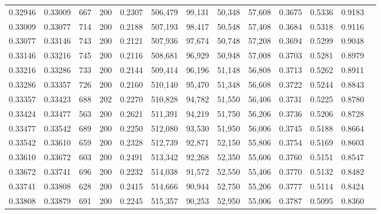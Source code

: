 \begin{tabular}{rrrrrrrrrrrrr}
0.32946 & 0.33009 &    667 & 200 &                                     0.2307 & 506,479 &  99,131 &  50,348 &  57,608 & 0.3675 & 0.5336 & 0.9183 \\
0.33009 & 0.33077 &    714 & 200 &                                     0.2188 & 507,193 &  98,417 &  50,548 &  57,408 & 0.3684 & 0.5318 & 0.9116 \\
0.33077 & 0.33146 &    743 & 200 &                                     0.2121 & 507,936 &  97,674 &  50,748 &  57,208 & 0.3694 & 0.5299 & 0.9048 \\
0.33146 & 0.33216 &    745 & 200 &                                     0.2116 & 508,681 &  96,929 &  50,948 &  57,008 & 0.3703 & 0.5281 & 0.8979 \\
0.33216 & 0.33286 &    733 & 200 &                                     0.2144 & 509,414 &  96,196 &  51,148 &  56,808 & 0.3713 & 0.5262 & 0.8911 \\
0.33286 & 0.33357 &    726 & 200 &                                     0.2160 & 510,140 &  95,470 &  51,348 &  56,608 & 0.3722 & 0.5244 & 0.8843 \\
0.33357 & 0.33423 &    688 & 202 &                                     0.2270 & 510,828 &  94,782 &  51,550 &  56,406 & 0.3731 & 0.5225 & 0.8780 \\
0.33424 & 0.33477 &    563 & 200 &                                     0.2621 & 511,391 &  94,219 &  51,750 &  56,206 & 0.3736 & 0.5206 & 0.8728 \\
0.33477 & 0.33542 &    689 & 200 &                                     0.2250 & 512,080 &  93,530 &  51,950 &  56,006 & 0.3745 & 0.5188 & 0.8664 \\
0.33542 & 0.33610 &    659 & 200 &                                     0.2328 & 512,739 &  92,871 &  52,150 &  55,806 & 0.3754 & 0.5169 & 0.8603 \\
0.33610 & 0.33672 &    603 & 200 &                                     0.2491 & 513,342 &  92,268 &  52,350 &  55,606 & 0.3760 & 0.5151 & 0.8547 \\
0.33672 & 0.33741 &    696 & 200 &                                     0.2232 & 514,038 &  91,572 &  52,550 &  55,406 & 0.3770 & 0.5132 & 0.8482 \\
0.33741 & 0.33808 &    628 & 200 &                                     0.2415 & 514,666 &  90,944 &  52,750 &  55,206 & 0.3777 & 0.5114 & 0.8424 \\
0.33808 & 0.33879 &    691 & 200 &                                     0.2245 & 515,357 &  90,253 &  52,950 &  55,006 & 0.3787 & 0.5095 & 0.8360 \\

\end{tabular}
